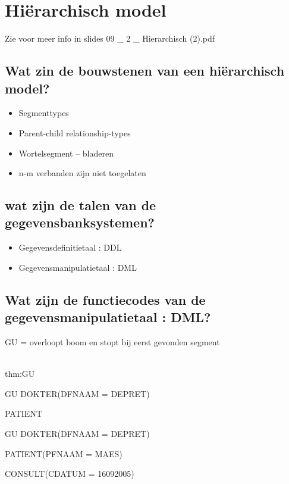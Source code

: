 \newpage

\section{Hiërarchisch model  }

Zie voor meer info in slides 09 \_ 2 \_ Hierarchisch (2).pdf

\subsection{Wat zin de bouwstenen van een hiërarchisch model?}

\begin{itemize}
\item Segmenttypes
\item Parent-child relationship-types
\item Wortelsegment – bladeren
\item n-m verbanden zijn niet toegelaten
\end{itemize}

\subsection{wat zijn de talen van de gegevensbanksystemen?}
\begin{itemize}
\item Gegevensdefinitietaal : DDL
\item Gegevensmanipulatietaal : DML
\end{itemize}


\subsection{Wat zijn de functiecodes van de gegevensmanipulatietaal : DML?}

GU = overloopt boom en stopt bij eerst gevonden segment\\\\

\begin{theo}[Voorbeeld GU]{thm:GU}

GU DOKTER(DFNAAM = DEPRET)

       PATIENT

GU DOKTER(DFNAAM = DEPRET)

       PATIENT(PFNAAM = MAES)
       
       CONSULT(CDATUM = 16092005)

\end{theo}




